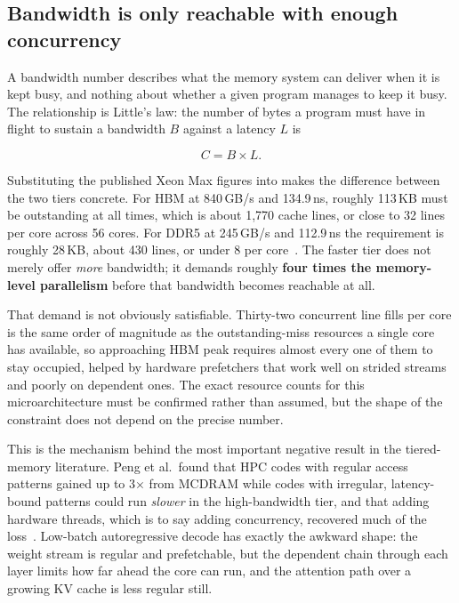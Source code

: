 \subsection{Bandwidth is only reachable with enough concurrency}
\label{sec:littles-law}

A bandwidth number describes what the memory system can deliver when it
is kept busy, and nothing about whether a given program manages to keep
it busy.  The relationship is Little's law: the number of bytes a
program must have in flight to sustain a bandwidth \(B\) against a
latency \(L\) is

\begin{equation}
\label{eq:little}
  C = B \times L .
\end{equation}

Substituting the published Xeon Max figures into 
makes the difference between the two tiers concrete.  For HBM at 840\,GB/s and 134.9\,ns, roughly
113\,KB must be outstanding at all times, which is about 1{,}770 cache
lines, or close to 32 lines per core across 56 cores.  For DDR5 at 245\,GB/s
and 112.9\,ns the requirement is roughly 28\,KB, about 430 lines, or
under 8 per core~\cite{ibeid2025aurora}.  The faster tier does not merely
offer \emph{more} bandwidth; it demands roughly \textbf{four times the
memory-level parallelism} before that bandwidth becomes reachable at
all.

That demand is not obviously satisfiable.  Thirty-two concurrent line
fills per core is the same order of magnitude as the outstanding-miss
resources a single core has available, so approaching HBM peak requires
almost every one of them to stay occupied, helped by hardware
prefetchers that work well on strided streams and poorly on dependent
ones.  The exact resource counts for this microarchitecture must be
confirmed rather than assumed, but the shape of the constraint does not
depend on the precise number.

This is the mechanism behind the most important negative result in the
tiered-memory literature.  Peng et al.\ found that HPC codes with
regular access patterns gained up to 3$\times$ from MCDRAM while codes
with irregular, latency-bound patterns could run \emph{slower} in the
high-bandwidth tier, and that adding hardware threads, which is to say adding concurrency,
recovered much of the loss~\cite{peng2017hybridmemory}.  Low-batch autoregressive decode has
exactly the awkward shape: the weight stream is regular and prefetchable,
but the dependent chain through each layer limits how far ahead the core
can run, and the attention path over a growing KV cache is less regular
still.


